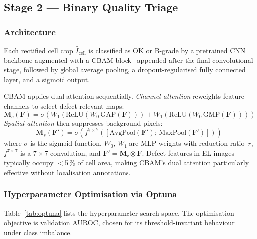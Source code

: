 \documentclass[conference]{IEEEtran}
\begin{document}
\subsection{Stage 2 --- Binary Quality Triage}
\label{sec:stage2}

\subsubsection{Architecture}

Each rectified cell crop $\hat{I}_{\text{cell}}$ is
classified as OK or B-grade by a pretrained CNN backbone
augmented with a CBAM block~\cite{woo2018} appended after
the final convolutional stage, followed by global average
pooling, a dropout-regularised fully connected layer, and
a sigmoid output.

CBAM applies dual attention sequentially.
\textit{Channel attention} reweights feature channels to
select defect-relevant maps:
\begin{equation}
  \mathbf{M}_c(\mathbf{F}) = \sigma\!\left(
    W_1\!\left(\text{ReLU}\!\left(W_0\,\text{GAP}(\mathbf{F})\right)\right) +
    W_1\!\left(\text{ReLU}\!\left(W_0\,\text{GMP}(\mathbf{F})\right)\right)
  \right)
  \label{eq:cbam_channel}
\end{equation}
\textit{Spatial attention} then suppresses background pixels:
\begin{equation}
  \mathbf{M}_s(\mathbf{F}') = \sigma\!\left(
    f^{7\times7}\!\!\left(
      \left[\text{AvgPool}(\mathbf{F}');\,\text{MaxPool}(\mathbf{F}')\right]
    \right)\right)
  \label{eq:cbam_spatial}
\end{equation}
where $\sigma$ is the sigmoid function, $W_0$, $W_1$ are MLP
weights with reduction ratio~$r$, $f^{7\times7}$ is a
$7{\times}7$ convolution, and
$\mathbf{F}' = \mathbf{M}_c \otimes \mathbf{F}$.
Defect features in EL images typically occupy $<$5\,\% of
cell area, making CBAM's dual attention particularly
effective without localisation annotations.

\subsubsection{Hyperparameter Optimisation via Optuna}

Table~\ref{tab:optuna} lists the hyperparameter search space.
The optimisation objective is validation AUROC, chosen for
its threshold-invariant behaviour under class imbalance.
\end{document}
